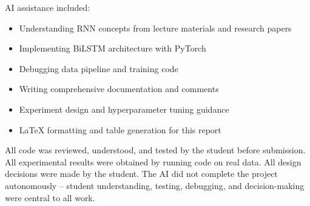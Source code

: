 \documentclass[letterpaper]{article}
\begin{document}
AI assistance included:
\begin{itemize}
\item Understanding RNN concepts from lecture materials and research papers
\item Implementing BiLSTM architecture with PyTorch
\item Debugging data pipeline and training code
\item Writing comprehensive documentation and comments
\item Experiment design and hyperparameter tuning guidance
\item LaTeX formatting and table generation for this report
\end{itemize}

All code was reviewed, understood, and tested by the student before submission. All experimental results were obtained by running code on real data. All design decisions were made by the student. The AI did not complete the project autonomously -- student understanding, testing, debugging, and decision-making were central to all work.


\end{document}
